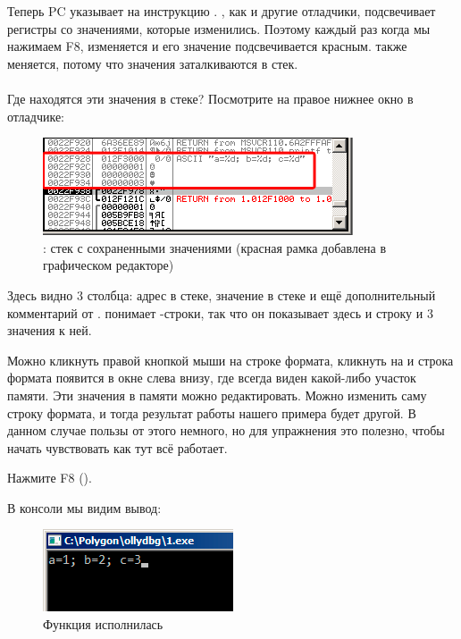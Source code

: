 Теперь \ac{PC} указывает на инструкцию .
\olly, как и другие отладчики, подсвечивает регистры со значениями, которые изменились.
Поэтому каждый раз когда мы нажимаем F8, \EIP изменяется и его значение подсвечивается красным.
\ESP также меняется, потому что значения заталкиваются в стек.\\
\\
Где находятся эти значения в стеке?
Посмотрите на правое нижнее окно в отладчике:

\begin{figure}[H]
\centering
\includegraphics[scale=\NormalScale]{patterns/03_printf/x86/olly3_stack.png}
\caption{\olly: стек с сохраненными значениями (красная рамка добавлена в графическом редакторе)}
\end{figure}

Здесь видно 3 столбца: адрес в стеке, значение в стеке и ещё дополнительный комментарий
от \olly. 
\olly понимает \printf{}-строки, так что он показывает здесь и строку и 3 значения  к ней.

Можно кликнуть правой кнопкой мыши на строке формата, кликнуть на 
и строка формата появится в окне слева внизу, где всегда виден какой-либо участок памяти.
Эти значения в памяти можно редактировать.
Можно изменить саму строку формата, и тогда результат работы нашего примера будет другой.
В данном случае пользы от этого немного, но для упражнения это полезно,
чтобы начать чувствовать как тут всё работает.

\clearpage
Нажмите F8 (\stepover).

В консоли мы видим вывод:

\begin{figure}[H]
\centering
\includegraphics[scale=\NormalScale]{patterns/03_printf/x86/olly3_console.png}
\caption{Функция \printf исполнилась}
\end{figure}

